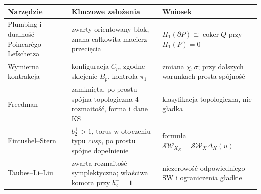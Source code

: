 \documentclass[11pt,a4paper]{report}
\numberwithin{equation}{section}
\theoremstyle{plain}
\theoremstyle{definition}
\theoremstyle{remark}
\begin{document}
\begin{center}
\begingroup
\footnotesize
\renewcommand{\arraystretch}{1.4}
\begin{tabular}{@{}p{.255\linewidth}p{.365\linewidth}p{.30\linewidth}@{}}
\hline
\textbf{Narzędzie} & \textbf{Kluczowe założenia} & \textbf{Wniosek}\\
\hline
{\raggedright Plumbing i dualność Poincar\'ego--Lefschetza\par}
 & {\raggedright zwarty orientowany blok, znana całkowita macierz przecięcia\par}
 & {\raggedright $H_1(\partial P)\cong\operatorname{coker}Q$ przy $H_1(P)=0$\par}\\
{\raggedright Wymierna kontrakcja\par}
 & {\raggedright konfiguracja $C_p$, zgodne sklejenie $B_p$, kontrola $\pi_1$\par}
 & {\raggedright zmiana $\chi,\sigma$; przy dalszych warunkach prosta spójność\par}\\
{\raggedright Freedman\par}
 & {\raggedright zamknięta, po prostu spójna topologiczna $4$-rozmaitość, forma i dane KS\par}
 & {\raggedright klasyfikacja topologiczna, nie gładka\par}\\
{\raggedright Fintushel--Stern\par}
 & {\raggedright $b_2^+>1$, torus w otoczeniu typu \emph{cusp}, po prostu spójne dopełnienie\par}
 & {\raggedright formuła $\mathcal{SW}_{X_K}=\mathcal{SW}_X\Delta_K(u)$\par}\\
{\raggedright Taubes--Li--Liu\par}
 & {\raggedright zwarta rozmaitość symplektyczna; właściwa komora przy $b_2^+=1$\par}
 & {\raggedright niezerowość odpowiedniego SW i ograniczenia gładkie\par}\\
\hline
\end{tabular}
\endgroup
\end{center}
\end{document}
